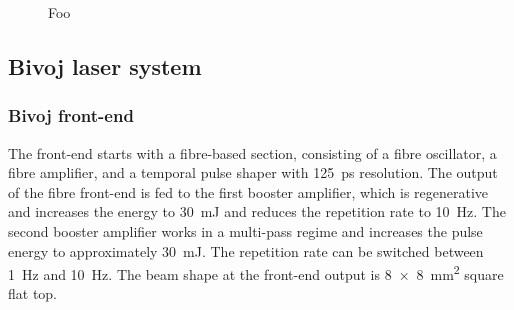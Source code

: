 \begin{figure}[H]
\begin{center}
  \hspace{1cm}
  \caption[Časové odezvy virtuálního modelu vodní nádrže]
    {Foo}
  \label{fig:lsplayout}
\end{center}
\end{figure}

\subsection{Bivoj laser system}

\subsubsection*{Bivoj front-end}

The front-end starts with a fibre-based section, consisting
of a fibre oscillator, a fibre amplifier, and a temporal pulse shaper
with \SI{125}{\ps} resolution. The output of the fibre front-end is fed
to the first booster amplifier, which is regenerative and
increases the energy to \SI{30}{\milli\joule} and reduces the repetition rate to \SI{10}{\hertz}. The second booster amplifier works in a multi-pass regime
and increases the pulse energy to approximately \SI{30}{\milli\joule}.
The repetition rate can be switched between \SI{1}{\hertz} and \SI{10}{\hertz}. The
beam shape at the front-end output is \SI{8 x 8}{\mm\squared} square flat top.

